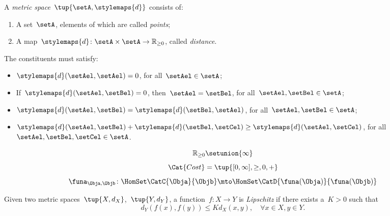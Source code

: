 {\begin{forslides}
\begin{equation*}
		\end{equation*}
		\begin{definition}
			\label{def:metric_space}
			A \emph{metric space}~$\tup{\setA,\stylemaps{d}}$ consists of:
			\begin{enumerate}
				\item A set~$\setA$, elements of which are called \emph{points};
				\item A map~$\stylemaps{d}\colon \setA\times \setA \to \mathbb{R}_{\geq 0}$, called \emph{distance}.
			\end{enumerate}
			The constituents must satisfy:
			\begin{itemize}
				\item $\stylemaps{d}(\setAel,\setAel)=0$, for all~$\setAel\in \setA$;
				\item If~$\stylemaps{d}(\setAel, \setBel)=0$, then~$\setAel=\setBel$, for all~$\setAel,\setBel\in \setA$;
				\item $\stylemaps{d}(\setAel, \setBel)=\stylemaps{d}(\setBel, \setAel)$, for all~$\setAel,\setBel\in \setA$;
				\item $\stylemaps{d}(\setAel, \setBel)+\stylemaps{d}(\setBel, \setCel)\geq \stylemaps{d}(\setAel, \setCel)$, for all~$\setAel,\setBel,\setCel\in \setA$.
			\end{itemize}
		\end{definition}
		\begin{equation*}
			\label{eq:r_with_inft}
			\mathbb{R}_{\geq 0}\setunion \{\infty\}
		\end{equation*}
		\begin{equation*}
			\label{eq:cost_cat}
			\Cat{Cost}=\tup{[0,\infty], \geq, 0, +}
		\end{equation*}
		\begin{equation*}
			\label{eq:enriched_fun_a}
			\funa_{\Obja, \Objb} \colon \HomSet\CatC{\Obja}{\Objb} \mto \HomSet\CatD{\funa(\Obja)}{\funa(\Objb)}
		\end{equation*}
		\begin{definition}
			\label{def:cost_enrich_a}
			Given two metric spaces~$\tup{X,d_X}$,~$\tup{Y,d_Y}$, a function~$f\colon X\to Y$ is \emph{Lipschitz} if there exists a~$K>0$ such that
			\begin{equation}
				d_Y(f(x),f(y))\leq Kd_X(x,y),\quad \forall x\in X,y\in Y.
			\end{equation}
		\end{definition}
	\end{forslides}
}

